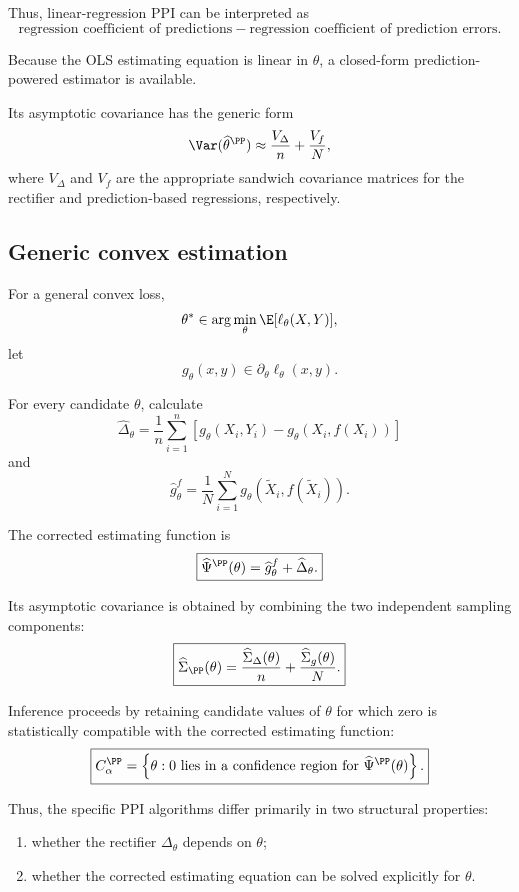 Thus, linear-regression PPI can be interpreted as
\[
\boxed{
\text{regression coefficient of predictions}
-
\text{regression coefficient of prediction errors}.
}
\]

Because the OLS estimating equation is linear in $\theta$, a
closed-form prediction-powered estimator is available.

Its asymptotic covariance has the generic form
\[
\Var(\widehat\theta^{\PP})
\approx
\frac{V_\Delta}{n}
+
\frac{V_f}{N},
\]
where $V_\Delta$ and $V_f$ are the appropriate sandwich covariance
matrices for the rectifier and prediction-based regressions,
respectively.

\subsection{Generic convex estimation}

For a general convex loss,
\[
\theta^*
\in
\arg\min_\theta
\E[\ell_\theta(X,Y)],
\]
let
\[
g_\theta(x,y)
\in
\partial_\theta\ell_\theta(x,y).
\]

For every candidate $\theta$, calculate
\[
\boxed{
\widehat\Delta_\theta
=
\frac{1}{n}
\sum_{i=1}^n
\left[
g_\theta(X_i,Y_i)
-
g_\theta(X_i,f(X_i))
\right]
}
\]
and
\[
\boxed{
\widehat g_\theta^f
=
\frac{1}{N}
\sum_{i=1}^N
g_\theta(
\widetilde X_i,
f(\widetilde X_i)
).
}
\]

The corrected estimating function is
\[
\boxed{
\widehat\Psi^{\PP}(\theta)
=
\widehat g_\theta^f
+
\widehat\Delta_\theta.
}
\]

Its asymptotic covariance is obtained by combining the two independent
sampling components:
\[
\boxed{
\widehat\Sigma_{\PP}(\theta)
=
\frac{\widehat\Sigma_\Delta(\theta)}{n}
+
\frac{\widehat\Sigma_g(\theta)}{N}.
}
\]

Inference proceeds by retaining candidate values of $\theta$ for which
zero is statistically compatible with the corrected estimating
function:
\[
\boxed{
C_\alpha^{\PP}
=
\left\{
\theta:
0
\text{ lies in a confidence region for }
\widehat\Psi^{\PP}(\theta)
\right\}.
}
\]

Thus, the specific PPI algorithms differ primarily in two structural
properties:

\begin{enumerate}[label=(\arabic*)]
    \item whether the rectifier $\Delta_\theta$ depends on $\theta$;
    \item whether the corrected estimating equation can be solved
    explicitly for $\theta$.
\end{enumerate}

